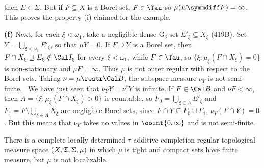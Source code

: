 {\noindent then $E\in\Sigma$.   But if $F\subseteq X$ is a Borel set,
$F\in\Tau$ so $\mu(E\symmdiff F)=\infty$.   This proves the property (i)
claimed for the example.

\medskip

{\bf (f)} Next, for each $\xi<\omega_1$, take a negligible dense
G$_{\delta}$ set $E'_{\xi}\subseteq X_{\xi}$ (419B).  Set
$Y=\bigcup_{\xi<\omega_1}E'_{\xi}$, so that $\mu Y=0$.   If
$F\supseteq Y$ is a Borel set, then
$F\cap X_{\xi}\supseteq E_{\xi}\notin\Cal I_{\xi}$ for every
$\xi<\omega_1$, while $F\in\Tau$, so
$\{\xi:\mu_{\xi}(F\cap X_{\xi})=0\}$ is non-stationary and
$\mu F=\infty$.   Thus $\mu$ is not
outer regular with respect to the Borel sets.   Taking
$\nu=\mu\restr\Cal B$, the subspace measure $\nu_Y$ is not semi-finite.
\Prf\ We have just seen that $\nu_YY=\nu^*Y$ is infinite.   If
$F\in\Cal B$ and $\nu F<\infty$, then
$A=\{\xi:\mu_{\xi}(F\cap X_{\xi})>0\}$ is countable, so
$F_0=\bigcup_{\xi\in A}E'_{\xi}$ and
$F_1=F\setminus\bigcup_{\xi\in A}X_{\xi}$ are negligible Borel sets;
since $F\cap Y\subseteq F_0\cup F_1$, $\nu_Y(F\cap Y)=0$.   But this
means that $\nu_Y$ takes no values in $\ooint{0,\infty}$ and is not
semi-finite.\ \Qed
}%


 There is a
complete locally determined $\tau$-additive completion regular
topological measure space $(X,\frak T,\Sigma,\mu)$ in which $\mu$ is
tight and compact sets have finite measure, but $\mu$ is not
localizable.

